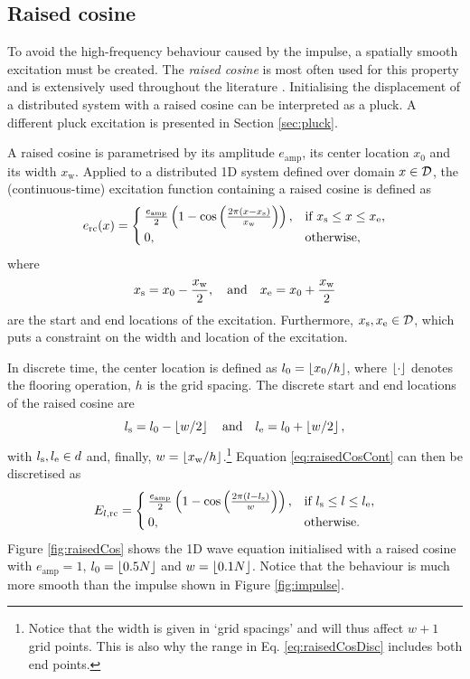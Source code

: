 \subsection{Raised cosine}\label{sec:raisedCosine}
To avoid the high-frequency behaviour caused by the impulse, a spatially smooth excitation must be created. The \textit{raised cosine} is most often used for this property and is extensively used throughout the literature \cite{theBible}. Initialising the displacement of a distributed system with a raised cosine can be interpreted as a pluck. A different pluck excitation is presented in Section \ref{sec:pluck}.

A raised cosine is parametrised by its amplitude $e_\text{amp}$, its center location $x_0$ and its width $x_\text{w}$. Applied to a distributed 1D system defined over domain $x\in \mathcal{D}$, the (continuous-time) excitation function containing a raised cosine is defined as 
\begin{equation}\label{eq:raisedCosCont}
    e_\text{rc}(x) = 
    \begin{cases}
        \frac{e_\text{amp}}{2}\left(1 - \cos\left(\frac{2\pi (x - x_{\text{s}})}{x_\text{w}}\right)\right), & \text{if } x_{\text{s}} \leq x \leq x_{\text{e}},\\
        0, & \text{otherwise},
    \end{cases}
\end{equation}
where 
\begin{equation}\label{eq:xsxe}
    x_{\text{s}} = x_0 - 
    \frac{x_\text{w}}{2}, \quad \text{and} \quad x_{\text{e}} = x_0 + \frac{x_\text{w}}{2}
\end{equation}
are the start and end locations of the excitation. Furthermore, $x_{\text{s}}, x_{\text{e}} \in \mathcal{D}$, which puts a constraint on the width and location of the excitation. 

In discrete time, the center location is defined as $l_0 = \floor[x_0 / h]$, where $\floor[\cdot]$ denotes the flooring operation, $h$ is the grid spacing. The discrete start and end locations of the raised cosine are
\begin{equation}\label{eq:lsle}
    l_\text{s} = l_0 - \floor[w/2]\qaq l_\etxt = l_0 + \floor[w/2],
\end{equation}
with $l_{\text{s}}, l_{\text{e}}\in d$ and, finally, $w = \floor[x_\text{w} / h]$.\footnote{Notice that the width is given in `grid spacings' and will thus affect $w+1$ grid points. This is also why the range in Eq. \eqref{eq:raisedCosDisc} includes both end points.} Equation \eqref{eq:raisedCosCont} can then be discretised as
\begin{equation}\label{eq:raisedCosDisc}
    E_{l, \text{rc}} =
    \begin{cases}
        \frac{e_\text{amp}}{2}\left(1 - \cos\left(\frac{2\pi (l - l_{\text{s}})}{w}\right)\right), & \text{if } l_{\text{s}} \leq l \leq l_{\text{e}},\\
        0, & \text{otherwise}.
    \end{cases}
\end{equation}
Figure \ref{fig:raisedCos} shows the 1D wave equation initialised with a raised cosine with $e_\text{amp} = 1$, $l_0 = \floor[0.5N]$ and $w = \floor[0.1N]$. Notice that the behaviour is much more smooth than the impulse shown in Figure \ref{fig:impulse}.

